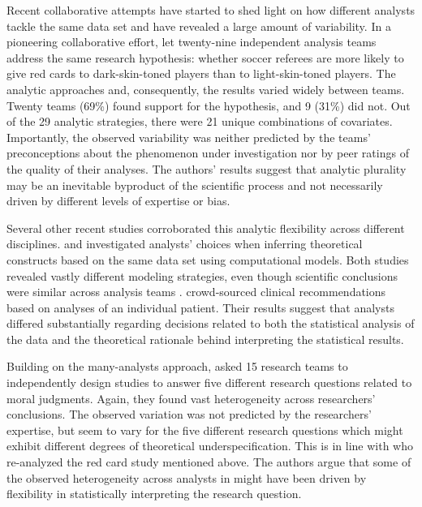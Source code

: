 \documentclass[Review,times,sageh]{sagej}
\begin{document}
Recent collaborative attempts have started to shed light on how different analysts tackle the same data set and have revealed a large amount of variability.
In a pioneering collaborative effort, \citet{silberzahn2018many} let twenty-nine independent analysis teams address the same research hypothesis: whether soccer referees are more likely to give red cards to dark-skin-toned players than to light-skin-toned players.
The analytic approaches and, consequently, the results varied widely between teams.
Twenty teams (69\%) found support for the hypothesis, and 9 (31\%) did not.
Out of the 29 analytic strategies, there were 21 unique combinations of covariates.
Importantly, the observed variability was neither predicted by the teams' preconceptions about the phenomenon under investigation nor by peer ratings of the quality of their analyses.
The authors' results suggest that analytic plurality may be an inevitable byproduct of the scientific process and not necessarily driven by different levels of expertise or bias.

Several other recent studies corroborated this analytic flexibility across different disciplines.
\citet{dutilh2019} and \citet{starns2019assessing} investigated analysts' choices when inferring theoretical constructs based on the same data set using computational models.
Both studies revealed vastly different modeling strategies, even though scientific conclusions were similar across analysis teams \citep[see also][and \citet{botvinik-nezer2020}, regarding analytic flexibility in ecology and neuroimaging data, respectively]{Parker2020}.
\citet{bastiaansen2020} crowd-sourced clinical recommendations based on analyses of an individual patient.
Their results suggest that analysts differed substantially regarding decisions related to both the statistical analysis of the data and the theoretical rationale behind interpreting the statistical results.

Building on the many-analysts approach, \citet{landy2020crowdsourcing} asked 15 research teams to independently design studies to answer five different research questions related to moral judgments.
Again, they found vast heterogeneity across researchers' conclusions.
The observed variation was not predicted by the researchers' expertise, but seem to vary for the five different research questions which might exhibit different degrees of theoretical underspecification.
This is in line with \citet{auspurg2021has} who re-analyzed the red card study mentioned above.
The authors argue that some of the observed heterogeneity across analysts in \citet{silberzahn2018many} might have been driven by flexibility in statistically interpreting the research question.
\end{document}

